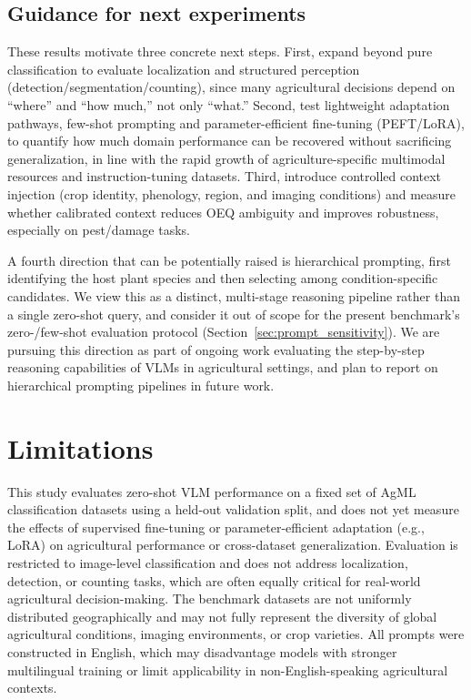 \documentclass[10pt,letterpaper]{article}
\begin{document}
\subsection{Guidance for next experiments}
\label{sec:next_experiments}
These results motivate three concrete next steps. First, expand beyond pure classification to evaluate localization and structured perception (detection/segmentation/counting), since many agricultural decisions depend on “where” and “how much,” not only “what.” Second, test lightweight adaptation pathways, few-shot prompting and parameter-efficient fine-tuning (PEFT/LoRA), to quantify how much domain performance can be recovered without sacrificing generalization, in line with the rapid growth of agriculture-specific multimodal resources and instruction-tuning datasets. Third, introduce controlled context injection (crop identity, phenology, region, and imaging conditions) and measure whether calibrated context reduces OEQ ambiguity and improves robustness, especially on pest/damage tasks.

A fourth direction that can be potentially raised is hierarchical prompting, first identifying the host plant species and then selecting among condition-specific candidates. We view this as a distinct, multi-stage reasoning pipeline rather than a single zero-shot query, and consider it out of scope for the present benchmark's zero-/few-shot evaluation protocol (Section~\ref{sec:prompt_sensitivity}). We are pursuing this direction as part of ongoing work evaluating the step-by-step reasoning capabilities of VLMs in agricultural settings, and plan to report on hierarchical prompting pipelines in future work.

\section{Limitations}
\label{sec:limitations}
This study evaluates zero-shot VLM performance on a fixed set of AgML classification datasets using a held-out validation split, and does not yet measure the effects of supervised fine-tuning or parameter-efficient adaptation (e.g., LoRA) on agricultural performance or cross-dataset generalization. Evaluation is restricted to image-level classification and does not address localization, detection, or counting tasks, which are often equally critical for real-world agricultural decision-making. The benchmark datasets are not uniformly distributed geographically and may not fully represent the diversity of global agricultural conditions, imaging environments, or crop varieties. All prompts were constructed in English, which may disadvantage models with stronger multilingual training or limit applicability in non-English-speaking agricultural contexts.
\end{document}
